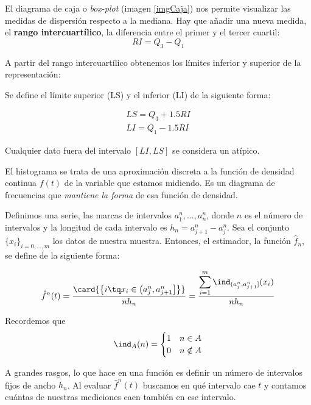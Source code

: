 \documentclass{apuntes}
\begin{document}
\begin{defn}
El diagrama de caja o \textit{box-plot}  (imagen \ref{imgCaja}) nos permite visualizar las medidas de dispersión respecto a la mediana. Hay que añadir una nueva medida, el \textbf{rango intercuartílico}, la diferencia entre el primer y el tercer cuartil: \[RI = Q_3 - Q_1 \]

\end{defn}

A partir del rango intercuartílico obtenemos los límites inferior y superior de la representación:

\begin{defn} Se define el límite superior (LS) y el inferior (LI) de la siguiente forma:

\begin{gather*}
LS = Q_3 + 1.5 RI \\
LI = Q_1 - 1.5 RI 
\end{gather*}

Cualquier dato fuera del intervalo $[LI, LS]$ se considera un atípico.
\end{defn}

\begin{defn}[Histograma]
El histograma se trata de una aproximación discreta a la función de densidad continua $f(t)$ de la variable que estamos midiendo. Es un diagrama de frecuencias que \textit{mantiene la forma} de esa función de densidad. 

Definimos una serie, las marcas de intervalos $a^n_1, \dotsc, a^n_n$, donde $n$ es el número de intervalos y la longitud de cada intervalo  es $h_n = a^n_{j+1} - a^n_j$. Sea el conjunto $\{x_i\}_{i=0,\dotsc,m}$ los datos de nuestra muestra. Entonces, el estimador, la función $\hat{f}_n$, se define de la siguiente forma:

\[ \hat{f}^n(t) = \frac{\card{\left\{i \tq x_i \in \left( a_j^n, a_{j+1}^n \right]\right\}}}{n h_n} = \frac{\displaystyle\sum_{i=1}^m \ind_{(a_j^n, a_{j+1}^n]} (x_i)}{n h_n} \]

Recordemos que \[ \ind_A (n) = \begin{cases} 1 & n \in A \\ 0 & n \notin A\end{cases}\]

A grandes rasgos, lo que hace en una función es definir un número de intervalos fijos de ancho $h_n$. Al evaluar $\hat{f}^n(t)$ buscamos en qué intervalo cae $t$ y contamos cuántas de nuestras mediciones caen también en ese intervalo.


\end{defn}
\end{document}
